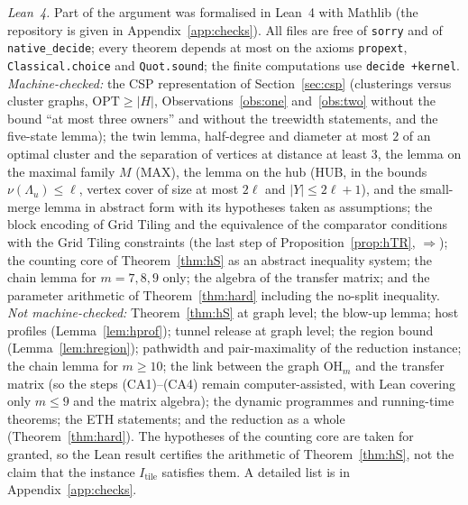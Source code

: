 \emph{Lean~4.} Part of the argument was formalised in Lean~4 with Mathlib (the repository is given in Appendix~\ref{app:checks}). All files are free of \texttt{sorry} and of \texttt{native\_decide}; every theorem depends at most on the axioms \texttt{propext}, \texttt{Classical.choice} and \texttt{Quot.sound}; the finite computations use \texttt{decide +kernel}.
\emph{Machine-checked:} the CSP representation of Section~\ref{sec:csp} (clusterings versus cluster graphs, $\mathrm{OPT}\ge|H|$, Observations~\ref{obs:one} and~\ref{obs:two} without the bound ``at most three owners'' and without the treewidth statements, and the five-state lemma); the twin lemma, half-degree and diameter at most $2$ of an optimal cluster and the separation of vertices at distance at least $3$, the lemma on the maximal family $M$ (MAX), the lemma on the hub (HUB, in the bounds $\nu(\Lambda_u)\le\ell$, vertex cover of size at most $2\ell$ and $|Y|\le2\ell+1$), and the small-merge lemma in abstract form with its hypotheses taken as assumptions; the block encoding of Grid Tiling and the equivalence of the comparator conditions with the Grid Tiling constraints (the last step of Proposition~\ref{prop:hTR}, $\Rightarrow$); the counting core of Theorem~\ref{thm:hS} as an abstract inequality system; the chain lemma for $m=7,8,9$ only; the algebra of the transfer matrix; and the parameter arithmetic of Theorem~\ref{thm:hard} including the no-split inequality.
\emph{Not machine-checked:} Theorem~\ref{thm:hS} at graph level; the blow-up lemma; host profiles (Lemma~\ref{lem:hprof}); tunnel release at graph level; the region bound (Lemma~\ref{lem:hregion}); pathwidth and pair-maximality of the reduction instance; the chain lemma for $m\ge10$; the link between the graph $\mathrm{OH}_m$ and the transfer matrix (so the steps (CA1)--(CA4) remain computer-assisted, with Lean covering only $m\le9$ and the matrix algebra); the dynamic programmes and running-time theorems; the ETH statements; and the reduction as a whole (Theorem~\ref{thm:hard}). The hypotheses of the counting core are taken for granted, so the Lean result certifies the arithmetic of Theorem~\ref{thm:hS}, not the claim that the instance $I_{\mathrm{tile}}$ satisfies them. A detailed list is in Appendix~\ref{app:checks}.
